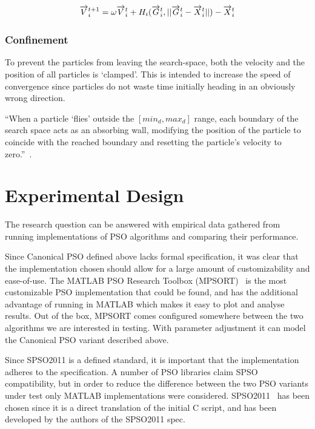 \documentclass{csfourzero}
\newcommand{\rarrow}[1]{\overrightarrow{#1\vphantom{b}}}
\begin{document}
\begin{equation}
  \rarrow{V}_i^{t+1} = \omega \rarrow{V}_i^t + H_i(\rarrow{G}_i^t,||\rarrow{G}_i^t - \rarrow{X}_i^t||) - \rarrow{X}_i^t
\end{equation}

\subsubsection{Confinement} %

To prevent the particles from leaving the search-space, both the velocity and
the position of all particles is `clamped'. This is intended to increase the
speed of convergence since particles do not waste time initially heading in an
obviously wrong direction.

``When a particle `flies' outside the $[min_d ,max_d]$ range, each boundary of
the search space acts as an absorbing wall, modifying the position of the
particle to coincide with the reached boundary and resetting the particle's
velocity to zero.''~\cite{ZambranoBigiarini:2013dl}.

\section{Experimental Design}

The research question can be answered with empirical data gathered from running
implementations of PSO algorithms and comparing their performance.

Since Canonical PSO defined above lacks formal specification, it was clear that
the implementation chosen should allow for a large amount of customizability and
ease-of-use.  The MATLAB PSO Research Toolbox
(MPSORT)~\cite{MATLABPSOResearch:2011ux} is the most customizable PSO
implementation that could be found, and has the additional advantage of running
in MATLAB which makes it easy to plot and analyse results. Out of the box,
MPSORT comes configured somewhere between the two algorithms we are interested
in testing. With parameter adjustment it can model the Canonical PSO variant
described above.

Since SPSO2011 is a defined standard, it is important that the implementation
adheres to the specification. A number of PSO libraries claim SPSO
compatibility, but in order to reduce the difference between the two PSO
variants under test only MATLAB implementations were considered.
SPSO2011~\cite{SPSOMATLAB:zOjlExcK} has been chosen since it is a direct
translation of the initial C script, and has been developed by the authors of
the SPSO2011 spec.
\end{document}
